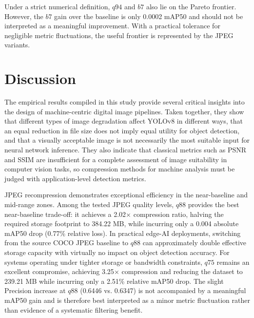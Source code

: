 \documentclass[12pt, a4paper]{article}
\begin{document}
Under a strict numerical definition, $q94$ and $b7$ also lie on the Pareto frontier. However, the $b7$ gain over the baseline is only 0.0002 mAP50 and should not be interpreted as a meaningful improvement. With a practical tolerance for negligible metric fluctuations, the useful frontier is represented by the JPEG variants.

\section{Discussion}
The empirical results compiled in this study provide several critical insights into the design of machine-centric digital image pipelines. Taken together, they show that different types of image degradation affect YOLOv8 in different ways, that an equal reduction in file size does not imply equal utility for object detection, and that a visually acceptable image is not necessarily the most suitable input for neural network inference. They also indicate that classical metrics such as PSNR and SSIM are insufficient for a complete assessment of image suitability in computer vision tasks, so compression methods for machine analysis must be judged with application-level detection metrics.

JPEG recompression demonstrates exceptional efficiency in the near-baseline and mid-range zones. Among the tested JPEG quality levels, $q88$ provides the best near-baseline trade-off: it achieves a 2.02$\times$ compression ratio, halving the required storage footprint to 384.22 MB, while incurring only a 0.004 absolute mAP50 drop (0.77\% relative loss). In practical edge-AI deployments, switching from the source COCO JPEG baseline to $q88$ can approximately double effective storage capacity with virtually no impact on object detection accuracy. For systems operating under tighter storage or bandwidth constraints, $q75$ remains an excellent compromise, achieving 3.25$\times$ compression and reducing the dataset to 239.21 MB while incurring only a 2.51\% relative mAP50 drop. The slight Precision increase at $q88$ (0.6446 vs. 0.6347) is not accompanied by a meaningful mAP50 gain and is therefore best interpreted as a minor metric fluctuation rather than evidence of a systematic filtering benefit.
\end{document}
